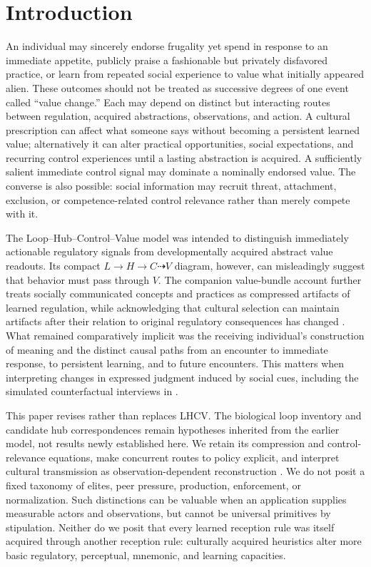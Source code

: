 \documentclass[11pt,a4paper]{article}
\begin{document}
\section{Introduction}
An individual may sincerely endorse frugality yet spend in response to an immediate appetite, publicly praise a fashionable but privately disfavored practice, or learn from repeated social experience to value what initially appeared alien. These outcomes should not be treated as successive degrees of one event called ``value change.'' Each may depend on distinct but interacting routes between regulation, acquired abstractions, observations, and action. A cultural prescription can affect what someone says without becoming a persistent learned value; alternatively it can alter practical opportunities, social expectations, and recurring control experiences until a lasting abstraction is acquired. A sufficiently salient immediate control signal may dominate a nominally endorsed value. The converse is also possible: social information may recruit threat, attachment, exclusion, or competence-related control relevance rather than merely compete with it.

The Loop--Hub--Control--Value model \citep{zarnckeLHCV,zarnckeLoops} was intended to distinguish immediately actionable regulatory signals from developmentally acquired abstract value readouts. Its compact $L\to H\to C\dashrightarrow V$ diagram, however, can misleadingly suggest that behavior must pass through $V$. The companion value-bundle account further treats socially communicated concepts and practices as compressed artifacts of learned regulation, while acknowledging that cultural selection can maintain artifacts after their relation to original regulatory consequences has changed \citep{zarnckeDrift,zarnckeEmbedded}. What remained comparatively implicit was the receiving individual's construction of meaning and the distinct causal paths from an encounter to immediate response, to persistent learning, and to future encounters. This matters when interpreting changes in expressed judgment induced by social cues, including the simulated counterfactual interviews in \citet{zarnckeTalkie}.

This paper revises rather than replaces LHCV. The biological loop inventory and candidate hub correspondences remain hypotheses inherited from the earlier model, not results newly established here. We retain its compression and control-relevance equations, make concurrent routes to policy explicit, and interpret cultural transmission as observation-dependent reconstruction \citep{sperber1996,kalish2007}. We do not posit a fixed taxonomy of elites, peer pressure, production, enforcement, or normalization. Such distinctions can be valuable when an application supplies measurable actors and observations, but cannot be universal primitives by stipulation. Neither do we posit that every learned reception rule was itself acquired through another reception rule: culturally acquired heuristics alter more basic regulatory, perceptual, mnemonic, and learning capacities.
\end{document}
